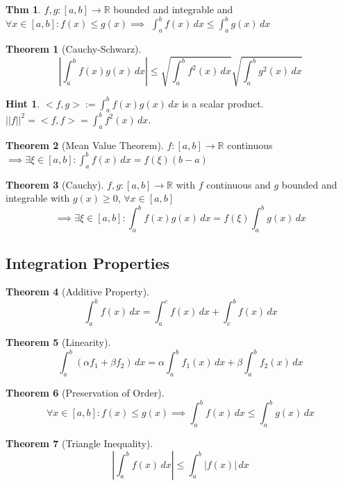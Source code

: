 \documentclass[a4paper, 10pt]{article}
\theoremstyle{definition}
\newtheorem*{theorem}{Thm}
\newtheorem*{note_wrapper}{Hint}
\theoremstyle{named}
\newtheorem*{ntheorem_wrapper}{Theorem}
\newenvironment{ntheorem}%
    {\begin{mdframed}[style=important]\begin{ntheorem_wrapper}}%
    {\end{ntheorem_wrapper}\end{mdframed}}
\newenvironment{note}%
    {\begin{mdframed}[style=trick]\begin{note_wrapper}}%
    {\end{note_wrapper}\end{mdframed}}
\newcommand{\R}{\mathbb{R}}
\begin{document}
\begin{theorem}
    $f, g: [a, b] \to \R$ bounded and integrable and \\
    $\forall x \in [a, b]: f(x) \leq g(x) \implies$
    $\int_a^b f(x) \,dx \leq \int_a^b g(x) \,dx$
\end{theorem}

\begin{ntheorem}[Cauchy-Schwarz]
    $$\left|\int_a^b f(x)g(x) \,dx\right| \leq \sqrt{\int_a^b f^2(x) \,dx}\sqrt{\int_a^b g^2(x) \,dx}$$
\end{ntheorem}

\begin{note}
    $<f, g> := \int_a^b f(x)g(x) \,dx$ is a scalar product. \\
    $||f||^2 = <f, f> = \int_a^b f^2(x) \,dx$.
\end{note}

\begin{ntheorem}[Mean Value Theorem]
    $f: [a, b] \to \R$ continuous $\implies \exists \xi \in [a, b]: \int_a^b f(x) \,dx = f(\xi)(b - a)$
\end{ntheorem}

\begin{ntheorem}[Cauchy]
    $f, g: [a, b] \to \R$ with $f$ continuous and $g$ bounded and integrable with $g(x) \geq 0$, $\forall x \in [a, b]$
    $$\implies \exists \xi \in [a, b]: \int_a^b f(x)g(x) \,dx = f(\xi)\int_a^b g(x) \,dx$$
\end{ntheorem}

\subsection{Integration Properties}
\begin{ntheorem}[Additive Property]
    $$\int_a^b f(x) \,dx = \int_a^c f(x) \,dx + \int_c^b f(x) \,dx$$
\end{ntheorem}

\begin{ntheorem}[Linearity]
    $$\int_a^b(\alpha f_1 + \beta f_2) \,dx = \alpha \int_a^b f_1(x) \,dx + \beta \int_a^b f_2(x) \,dx$$
\end{ntheorem}

\begin{ntheorem}[Preservation of Order]
    $$\forall x \in [a, b]: f(x) \leq g(x) \implies \int_a^b f(x) \,dx \leq \int_a^b g(x) \,dx$$
\end{ntheorem}

\begin{ntheorem}[Triangle Inequality]
    $$\left|\int_a^b f(x) \,dx\right| \leq \int_a^b |f(x)| \,dx$$
\end{ntheorem}
\end{document}
